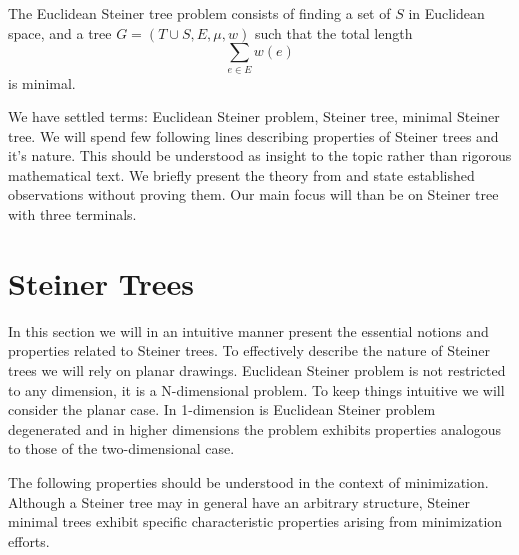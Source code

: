 \documentclass[openany]{book}
\begin{document}
	 The Euclidean Steiner tree problem consists of finding a set of \(S\) in Euclidean space, and a tree \( G = (T \cup S, E,\mu, w) \) such that the total length
	 \[
	 \sum_{e \in E} w(e)
	 \]
	 is minimal.
	 
	 We have settled terms: Euclidean Steiner problem, Steiner tree, minimal Steiner tree. We will spend few following lines describing properties of Steiner trees and it's nature. This should be understood as insight to the topic rather than rigorous mathematical text. We briefly present the theory from \cite{soothill2010} and state established observations without proving them. Our main focus will than be on Steiner tree with three terminals.
	 
	\section{Steiner Trees}\label{sec:steiner_trees}
	In this section we will in an intuitive manner present the essential notions and properties related to Steiner trees. To effectively describe the nature of Steiner trees we will rely on planar drawings. Euclidean Steiner problem is not restricted to any dimension, it is a N-dimensional problem. To keep things intuitive we will consider the planar case. In 1-dimension is Euclidean Steiner problem degenerated and in higher dimensions the problem exhibits properties analogous to those of the two-dimensional case. 
	
	The following properties should be understood in the context of minimization. Although a Steiner tree may in general have an arbitrary structure, Steiner minimal trees exhibit specific characteristic properties arising from minimization efforts.
	
\end{document}
